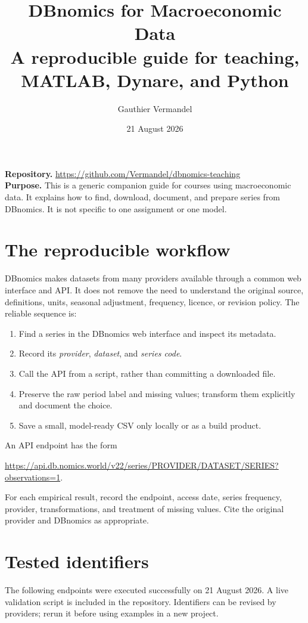 \documentclass[11pt,a4paper]{article}
\title{\textbf{DBnomics for Macroeconomic Data}\\
\large A reproducible guide for teaching, MATLAB, Dynare, and Python}
\author{Gauthier Vermandel}
\date{21 August 2026}
\begin{document}
\maketitle

\noindent\textbf{Repository.} \url{https://github.com/Vermandel/dbnomics-teaching}\\
\textbf{Purpose.} This is a generic companion guide for courses using
macroeconomic data. It explains how to find, download, document, and prepare
series from DBnomics. It is not specific to one assignment or one model.

\section{The reproducible workflow}

DBnomics makes datasets from many providers available through a common web
interface and API. It does not remove the need to understand the original
source, definitions, units, seasonal adjustment, frequency, licence, or
revision policy. The reliable sequence is:

\begin{enumerate}
\item Find a series in the DBnomics web interface and inspect its metadata.
\item Record its \emph{provider}, \emph{dataset}, and \emph{series code}.
\item Call the API from a script, rather than committing a downloaded file.
\item Preserve the raw period label and missing values; transform them
      explicitly and document the choice.
\item Save a small, model-ready CSV only locally or as a build product.
\end{enumerate}

An API endpoint has the form
\begin{center}
\url{https://api.db.nomics.world/v22/series/PROVIDER/DATASET/SERIES?observations=1}.
\end{center}
For each empirical result, record the endpoint, access date, series frequency,
provider, transformations, and treatment of missing values. Cite the original
provider and DBnomics as appropriate.

\section{Tested identifiers}

The following endpoints were executed successfully on 21 August 2026. A live
validation script is included in the repository. Identifiers can be revised
by providers; rerun it before using examples in a new project.
\end{document}
